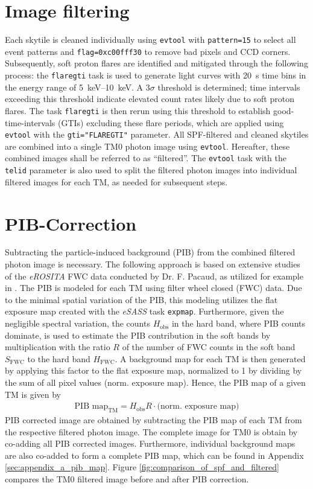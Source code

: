 \section{Image filtering}
Each skytile is cleaned individually using \texttt{evtool} with \texttt{pattern=15} to select all event patterns and \texttt{flag=0xc00fff30} to remove bad pixels and CCD corners. Subsequently, soft proton flares are identified and mitigated through the following process: the \texttt{flaregti} task is used to generate light curves with \SI{20}{\second} time bins in the energy range of \SIrange{5}{10}{\kilo\electronvolt}. A \(3\sigma\) threshold is determined; time intervals exceeding this threshold indicate elevated count rates likely due to soft proton flares. The task \texttt{flaregti} is then rerun using this threshold to establish good-time-intervals (GTIs) excluding these flare periods, which are applied using \texttt{evtool} with the \texttt{gti="FLAREGTI"} parameter. All SPF-filtered and cleaned skytiles are combined into a single TM0 photon image using \texttt{evtool}. Hereafter, these combined images shall be referred to as \enquote{filtered}. The \texttt{evtool} task with the \texttt{telid} parameter is also used to split the filtered photon images into individual filtered images for each TM, as needed for subsequent steps.
%
\section{PIB-Correction}
Subtracting the particle-induced background (PIB) from the combined filtered photon image is necessary. The following  approach is based on extensive studies of the \textit{eROSITA} FWC data conducted by Dr. F. Pacaud, as utilized for example in \cite{Reiprich2021}.  The PIB is modeled for each TM using filter wheel closed (FWC) data. Due to the minimal spatial variation of the PIB, this modeling utilizes the flat exposure map created with the \textit{eSASS} task \texttt{expmap}. Furthermore, given the negligible spectral variation, the counts \(H_\text{obs}\) in the hard band, where PIB counts dominate, is used to estimate the PIB contribution in the soft bands by multiplication with the ratio \(R\) of the number of FWC counts in the soft band \(S_{\text{FWC}}\) to the hard band \(H_\text{FWC}\). A background map for each TM is then generated by applying this factor to the flat exposure map, normalized to 1 by dividing by the sum of all pixel values (norm. exposure map). Hence, the PIB map of a given TM is given by
\begin{align*}
    \text{PIB map}_\text{TM} = H_\text{obs}R\cdot\bigl(\text{norm. exposure map}\bigr)
\end{align*}
PIB corrected image are obtained by subtracting the PIB map of each TM from the respective filtered photon image. The complete image for TM0 is obtain by co-adding all PIB corrected images. Furthermore, individual background maps are also co-added to form a complete PIB map, which can be found in Appendix \ref{sec:appendix_a_pib_map}. Figure \ref{fig:comparison_of_spf_and_filtered} compares the TM0 filtered image before and after PIB correction.
%
